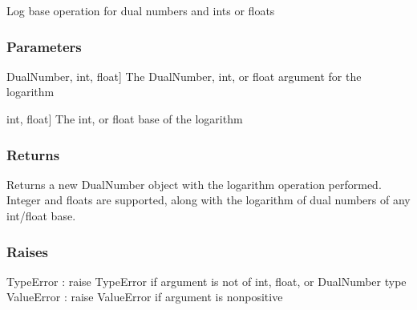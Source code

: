 \documentclass[letterpaper,10pt,english]{sphinxmanual}
\begin{document}
\begin{fulllineitems}
\label{\detokenize{autodiff:autodiff.operators.log_base}}
\pysigstartsignatures
{}
\pysigstopsignatures
\sphinxAtStartPar
Log base operation for dual numbers and ints or floats


\subsubsection{Parameters}
\label{\detokenize{autodiff:id27}}\begin{description}
\sphinxlineitem{x}{[}DualNumber, int, float{]}
\sphinxAtStartPar
The DualNumber, int, or float argument for the logarithm

\sphinxlineitem{x}{[}int, float{]}
\sphinxAtStartPar
The int, or float base of the logarithm

\end{description}


\subsubsection{Returns}
\label{\detokenize{autodiff:id28}}\begin{description}
\sphinxAtStartPar
Returns a new DualNumber object with the logarithm operation performed. Integer and
floats are supported, along with the logarithm of dual numbers of any int/float base.

\end{description}


\subsubsection{Raises}
\label{\detokenize{autodiff:id29}}
\sphinxAtStartPar
TypeError : raise TypeError if argument is not of int, float, or DualNumber type
ValueError : raise ValueError if argument is nonpositive

\end{fulllineitems}

\end{document}
